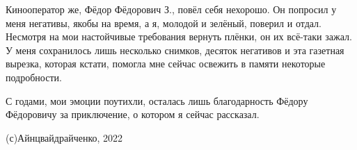 Кинооператор же, Фёдор Фёдорович З., повёл себя нехорошо. Он попросил у меня
негативы, якобы на время, а я, молодой и зелёный, поверил и отдал. Несмотря на
мои настойчивые требования вернуть плёнки, он их всё-таки зажал. У меня
сохранилось лишь несколько снимков, десяток негативов и эта газетная вырезка,
которая кстати, помогла мне сейчас освежить в памяти некоторые подробности.

С годами, мои эмоции поутихли, осталась лишь благодарность Фёдору Фёдоровичу за
приключение, о котором я сейчас рассказал.

(с)Айнцвайдрайченко, 2022

